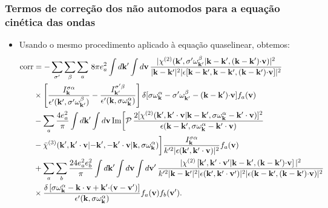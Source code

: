 \documentclass[10pt,aspectratio=1610,lualatex]{beamer}
\begin{document}
\begin{frame}
  \frametitle{Termos de correção dos não automodos para a equação
    cinética das ondas}
  \begin{itemize}
    \item Usando o mesmo procedimento aplicado à equação quaselinear,
    obtemos:
    \begin{equation*}
      \label{corr}
      \begin{split}
	\mbox{corr}&=-\sum_{\sigma '}\sum_\beta\sum_a \,8\pi e_a^2
	\int d{\bf k'}\int d{\bf v}\,
	\frac{|\chi^{(2)}({\bf k'},\sigma '\omega_{\bf k'}^\beta
	  |{\bf k-k'},({\bf k-k'}){\bf \cdot v})|^2}
	{|{\bf k-k'}|^2|\epsilon[{\bf k-k'},{\bf k-k'},
	  ({\bf k-k'}){\bf \cdot v}]|^2}\\
	&\times \left[ \frac{I_{\bf k}^{\sigma \alpha}}
	  {\epsilon '({\bf k'},\sigma '\omega_{\bf k'}^\beta)}
	  -\frac{I_{\bf k'}^{\sigma '\beta}}
	  {\epsilon '({\bf k},\sigma \omega_{\bf k}^\alpha)}\right]
	\delta[\sigma\omega_{\bf k}^\alpha-\sigma '\omega_{\bf k'}^\beta
	-({\bf k-k'}){\bf \cdot v}]f_a({\bf v})\\
	&-\sum_a \frac{4 e_a^2}{\pi}
	\int d{\bf k '}\int d{\bf v}\,\mbox{Im}\biggl[ \mathcal{P}\,
	\frac{2[\chi^{(2)}({\bf k'},{\bf k' \cdot v}|{\bf k-k'},
	  \sigma\omega_{\bf k}^\alpha-{\bf k'\cdot v})]^2}
	{\epsilon({\bf k-k'},\sigma \omega_{\bf k}^\alpha
	  -{\bf k'\cdot v})}\\
	&-\bar \chi^{(3)}({\bf k'},{\bf k' \cdot v}|{\bf -k'},
	{\bf -k'\cdot v}|{\bf k},\sigma\omega_{\bf k}^\alpha)\biggr]
	\frac{I_{\bf k}^{\sigma \alpha}}{k'^2|\epsilon({\bf k'},
	  {\bf k'\cdot v})|^2}f_a({\bf v})\\
	&+\sum_a\sum_b \frac{24 e_a^2 e_b^2}{\pi}\int d{\bf k '}
	\int d{\bf v} \int d{\bf v'}\,
	\frac{|\chi^{(2)} \left[ {\bf k'},{\bf k' \cdot v'}|
	    {\bf k-k'},({\bf k-k'}){\bf \cdot v} \right]|^2}
	{k'^2|{\bf k-k'}|^2|\epsilon({\bf k'},{\bf k'\cdot v'})|^2
	  |\epsilon({\bf k-k'},({\bf k-k'}){\bf \cdot v})|^2}\\
	&\times \frac{\delta \left[ \sigma\omega_{\bf k}^\alpha
	    -{\bf k \cdot v}+{\bf k' \cdot}({\bf v-v'})\right]}
	{\epsilon '({\bf k},\sigma\omega_{\bf k}^\alpha)}
	f_a({\bf v}) f_b({\bf v'}).
      \end{split}
    \end{equation*}
  \end{itemize}
\end{frame}
\end{document}
